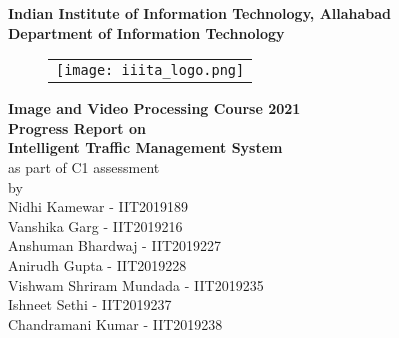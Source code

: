 \documentclass[12pt,a4paper,roman]{article}
\begin{document}
\begin{LARGE}
\begin{Center}
\textbf {Indian Institute of Information Technology, Allahabad \\ Department of Information Technology}
\end{Center}
\end{LARGE}


   \begin{figure} [ht]
   \begin{center}
   \begin{tabular}{c} 
   \texttt{[image: iiita\_logo.png]}
	\end{tabular}
	\end{center}
	\end{figure}

\begin{Center}
\begin{LARGE}
\textbf{Image and Video Processing Course 2021 \\
Progress Report on \\
Intelligent Traffic Management System \\
}
\vspace{5mm}
{as part of C1 assessment \\}
\vspace{5mm}
{by \\ }
\vspace{5mm}
{Nidhi Kamewar - IIT2019189\\}
{Vanshika Garg - IIT2019216\\}
{Anshuman Bhardwaj - IIT2019227\\}
{Anirudh Gupta - IIT2019228\\}
{Vishwam Shriram Mundada - IIT2019235\\}
{Ishneet Sethi - IIT2019237\\}
{Chandramani Kumar - IIT2019238\\}
\end{LARGE}
\end{Center}




\newpage
\end{document}
